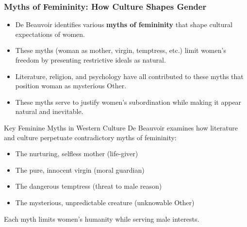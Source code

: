 \documentclass[aspectratio=169]{beamer}
\begin{document}
		\begin{frame}
			\frametitle{Myths of Femininity: How Culture Shapes Gender}
			\begin{itemize}
				\item De Beauvoir identifies various \textbf{myths of femininity} that shape cultural expectations of women.
				\item These myths (woman as mother, virgin, temptress, etc.) limit women's freedom by presenting restrictive ideals as natural.
				\item Literature, religion, and psychology have all contributed to these myths that position woman as mysterious Other.
				\item These myths serve to justify women's subordination while making it appear natural and inevitable.
			\end{itemize}
			
			\begin{block}{Key Feminine Myths in Western Culture}
				\scriptsize
				De Beauvoir examines how literature and culture perpetuate contradictory myths of femininity:
				\begin{itemize}
					\item The nurturing, selfless mother (life-giver)
					\item The pure, innocent virgin (moral guardian)
					\item The dangerous temptress (threat to male reason)
					\item The mysterious, unpredictable creature (unknowable Other)
				\end{itemize}
				Each myth limits women's humanity while serving male interests.
			\end{block}
		\end{frame}
		
\end{document}
